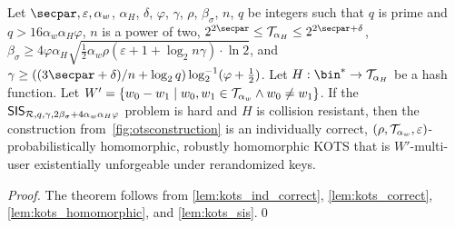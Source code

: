 \begin{theorem}\label{theo:kots}
Let $\secpar, \varepsilon, \alpha_w$, $\alpha_H$, $\delta$, $\varphi$, $\gamma$, $\rho$, $\beta_\sigma$, $n$, $q$ be integers such that $q$ is prime and $q > 16\alpha_w\alpha_H\varphi$, $n$ is a power of two, $2^{2\secpar}\leq \tern_{\alpha_H} \leq 2^{2\secpar+\delta}$, $\beta_\sigma \geq 4\varphi\alpha_H\sqrt{\tfrac{1}{2}\alpha_w\rho(\varepsilon+1+\log_2n\gamma)\cdot\ln2}$, and $\gamma\geq((3\secpar+\delta)/n+\log_2q)\log^{-1}_2(\varphi+\tfrac{1}{2})$.
Let $H : \bin^* \to \tern_{\alpha_H}$ be a hash function.
Let $W' = \{w_0-w_1\mid w_0,w_1\in\mathcal{T}_{\alpha_w} \land w_0\neq w_1\}$.
If the $\mathsf{SIS}_{\mathcal{R},q,\gamma,2\beta_\sigma+4\alpha_w\alpha_H\varphi}$ problem is hard and $H$ is collision resistant, then the construction from~\autoref{fig:otsconstruction} is an individually correct, $(\rho,\mathcal{T}_{\alpha_w},\varepsilon)$-probabilistically homomorphic, robustly homomorphic KOTS that is $W'$-multi-user existentially unforgeable under rerandomized keys.
\end{theorem}
\begin{proof}
The theorem follows from \autoref{lem:kots_ind_correct}, \autoref{lem:kots_correct}, \autoref{lem:kots_homomorphic}, and \autoref{lem:kots_sis}.\qed
\end{proof}

